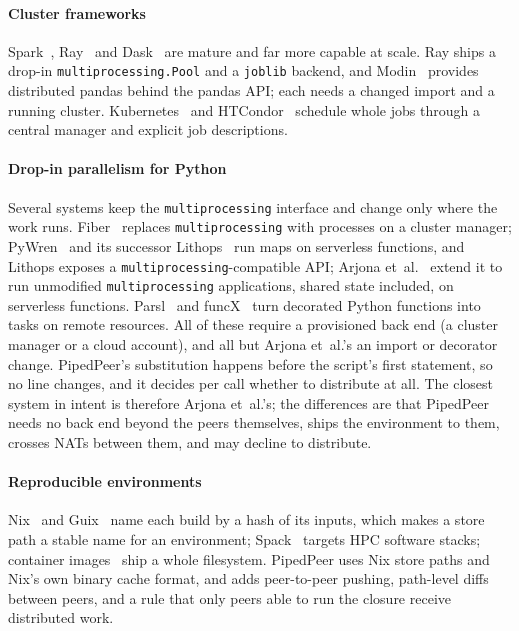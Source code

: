 \documentclass[5p,times,twocolumn]{elsarticle}
\begin{document}
\paragraph{Cluster frameworks} Spark~\cite{zaharia2010spark},
Ray~\cite{moritz2018ray} and Dask~\cite{rocklin2015dask} are mature and far
more capable at scale. Ray ships a drop-in \texttt{multiprocessing.Pool} and a
\texttt{joblib} backend, and Modin~\cite{petersohn2020modin} provides
distributed pandas behind the pandas API; each needs a changed import and a
running cluster. Kubernetes~\cite{burns2016borg} and HTCondor~\cite{litzkow1988condor}
schedule whole jobs through a central manager and explicit job descriptions.

\paragraph{Drop-in parallelism for Python} Several systems keep the
\texttt{multiprocessing} interface and change only where the work runs.
Fiber~\cite{zhi2020fiber} replaces \texttt{multiprocessing} with processes on a
cluster manager; PyWren~\cite{jonas2017pywren} and its successor
Lithops~\cite{sampe2021lithops} run maps on serverless functions, and Lithops
exposes a \texttt{multiprocessing}-compatible API; Arjona
et~al.~\cite{arjona2023transparent} extend it to run unmodified
\texttt{multiprocessing} applications, shared state included, on serverless
functions. Parsl~\cite{babuji2019parsl}
and funcX~\cite{chard2020funcx} turn decorated Python functions into tasks on
remote resources. All of these require a provisioned back end (a cluster manager or a cloud
account), and all but Arjona et~al.'s an import or decorator change. PipedPeer's
substitution happens before the script's first statement, so no line changes,
and it decides per call whether to distribute at all. The closest system in
intent is therefore Arjona et~al.'s; the differences are that PipedPeer
needs no back end beyond the peers themselves, ships the environment to them,
crosses NATs between them, and may decline to distribute.

\paragraph{Reproducible environments} Nix~\cite{dolstra2004nix,dolstra2006thesis}
and Guix~\cite{courtes2013guix} name each build by a hash of its inputs, which
makes a store path a stable name for an environment; Spack~\cite{gamblin2015spack}
targets HPC software stacks; container images~\cite{merkel2014docker,kurtzer2017singularity}
ship a whole filesystem. PipedPeer uses Nix store paths and Nix's own binary
cache format, and adds peer-to-peer pushing, path-level diffs between peers,
and a rule that only peers able to run the closure receive distributed work.
\end{document}
